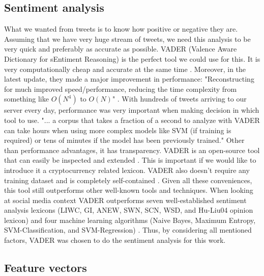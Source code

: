 \documentclass[a4paper,11pt,oneside]{article}
\begin{document}
  \subsection{Sentiment analysis}
  
  What we wanted from tweets is to know how positive or negative they are. Assuming that we have very huge stream of tweets, we need this analysis to be very quick and preferably as accurate as possible. VADER (Valence Aware Dictionary for sEntiment Reasoning) \cite{vader} is the perfect tool we could use for this. It is very computationally cheap and accurate at the same time \cite{vader}. Moreover, in the latest update, they made a major improvement in performance: "Reconstructing for much improved speed/performance, reducing the time complexity from something like $O(N^4)$ to $O(N)$" \cite{vadergit}. With hundreds of tweets arriving to our server every day, performance was very important when making decision in which tool to use. "... a corpus that takes a fraction of a second to analyze with VADER can take hours when using more complex models like SVM (if training is required) or tens of minutes if the model has been previously trained." \cite{vader} Other than performance advantages, it has transparency. VADER is an open-source tool that can easily be inspected and extended \cite{vader} \cite{vadergit}. This is important if we would like to introduce it a cryptocurrency related lexicon. VADER also doesn't require any training dataset and is completely self-contained \cite{vader}. Given all these conveniences, this tool still outperforms other well-known tools and techniques. When looking at social media context VADER outperforms seven well-established sentiment analysis lexicons (LIWC, GI, ANEW, SWN, SCN, WSD, and Hu-Liu04 opinion lexicon) and four machine learning algorithms (Naive Bayes, Maximum Entropy, SVM-Classification, and SVM-Regression) \cite{vader}. Thus, by considering all mentioned factors, VADER was chosen to do the sentiment analysis for this work.
  
  
  \subsection{Feature vectors}
  
\end{document}

